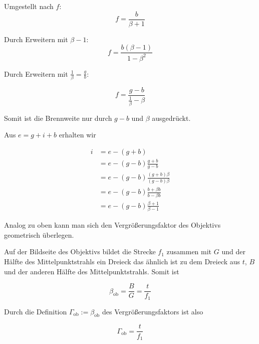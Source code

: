 \documentclass[a4paper,german,12pt,smallheadings]{scrartcl}
\begin{document}
Umgestellt nach $f$:
\begin{equation}
  f = \frac{b}{\beta + 1}
\end{equation}

Durch Erweitern mit $\beta - 1$:
\begin{equation}
  f = \frac{b(\beta - 1)}{1-\beta^2}
\end{equation}

Durch Erweitern mit $\frac{1}{\beta} = \frac{g}{b}$:

\begin{equation}
  f = \frac{g - b}{\frac{1}{\beta} - \beta}
\end{equation}

Somit ist die Brennweite nur durch $g-b$ und $\beta$ ausgedrückt.

Aus $e = g + i + b$ erhalten wir

\begin{align*}
  i &= e - (g+b) \\
    &= e - (g-b) \frac{g+b}{g-b} \\
    &= e - (g-b) \frac{(g+b)\beta}{(g-b)\beta} \\
    &= e - (g-b) \frac{b + \beta b}{b - \beta b} \\
    &= e - (g-b) \frac{\beta + 1}{\beta - 1}
\end{align*}


Analog zu oben kann man sich den Vergrößerungsfaktor des Objektivs geometrisch
überlegen.

Auf der Bildseite des Objektivs bildet die Strecke $f_1$ zusammen mit $G$ und
der Hälfte des Mittelpunktstrahls ein Dreieck das ähnlich ist zu dem Dreieck
aus $t$, $B$ und der anderen Hälfte des Mittelpunktstrahls. Somit ist

\begin{equation}
  \beta_\text{ob} = \frac{B}{G} = \frac{t}{f_1}
\end{equation}

Durch die Definition $\Gamma_\text{ob} := \beta_\text{ob}$ des
Vergrößerungsfaktors ist also

\begin{equation}
  \Gamma_\text{ob} = \frac{t}{f_1}
\end{equation}

\end{document}
